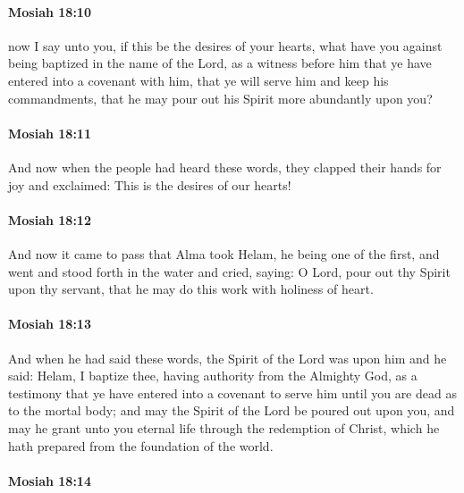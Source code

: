 		\paragraph{Mosiah 18:10} %
			\label{MOSIAH-18-10}

			now I say unto you,
			if this be the desires of your hearts,
			what have you against being baptized in the name of the Lord,
			as a witness before him
			that ye have entered into a covenant with him,
			that ye will serve him and keep his commandments,
			that he may pour out his Spirit more abundantly upon you?

		\paragraph{Mosiah 18:11} %
			\label{MOSIAH-18-11}

			And now when the people had heard these words,
			they clapped their hands for joy and exclaimed:
			This is the desires of our hearts!

		\paragraph{Mosiah 18:12} %
			\label{MOSIAH-18-12}

			And now it came to pass that Alma took Helam,
			he being one of the first,
			and went and stood forth in the water and cried, saying:
			O Lord, pour out thy Spirit upon thy servant,
			that he may do this work with holiness of heart.

		\paragraph{Mosiah 18:13} %
			\label{MOSIAH-18-13}

			And when he had said these words,
			the Spirit of the Lord was upon him and he said:
			Helam, I baptize thee,
			having authority from the Almighty God,
			as a testimony that ye have entered into a covenant to serve him
			until you are dead as to the mortal body;
			and may the Spirit of the Lord be poured out upon you,
			and may he grant unto you eternal life through the redemption of Christ,
			which he hath prepared from the foundation of the world.

		\paragraph{Mosiah 18:14} %
			\label{MOSIAH-18-14}


